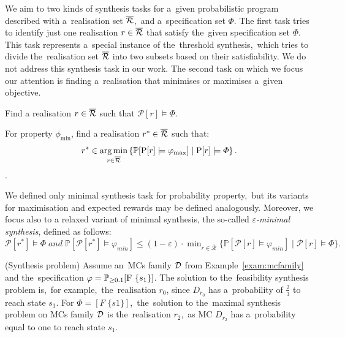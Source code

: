 We aim to two kinds of synthesis tasks for a~given probabilistic program described with a~realisation set $\overline{\mathcal{R}}$,~and a~specification set $\varPhi$.
The first task tries to identify just one realisation $r \in \overline{\mathcal{R}}$ that satisfy the~given specification set $\varPhi$.
This task represents a~special instance of the~threshold synthesis,~which tries to divide the~realisation set $\overline{\mathcal{R}}$ into two subsets based on their satisfiability.
We do not address this synthesis task in our work.
The second task on which we focus our attention is finding a~realisation that minimises or maximises a~given objective.

\begin{definition}[Feasibility]
Find a realisation $r \in \overline{\mathcal{R}}$ such that $\mathcal{P}[r] \models \varPhi$. 
\end{definition}

\begin{definition}[Minimality] \label{def:minimality}
For property $\phi_{\min}$, find a realisation $r^* \in \overline{\mathcal{R}}$ such that:
$$r^* \in \operatorname*{arg\,min}_{r \in \overline{\mathcal{R}}} \left \{ \mathbb{P}[\mathrm{P}[r] \models \varphi_{\max}] \mid \mathrm{P}[r] \models \varPhi \right \}.$$.
\end{definition}

We defined only minimal synthesis task for probability property,~but its variants for maximisation and expected rewards may be defined analogously.
Moreover, we focus also to a relaxed variant of minimal synthesis, the so-called \textit{$\varepsilon$-minimal synthesis}, defined as follows: $\mathcal{P}[r^*] \models \varPhi \; and \; 
\mathbb{P}[\mathcal{P}[r^*] \models \varphi_{min}] \leq (1 - \varepsilon) \cdot \min_{r \in \mathcal{\overline{R}}} \{ \mathbb{P}[\mathcal{P}[r] \models \varphi_{min}] \; \lvert \; \mathcal{P}[r] \models \varPhi \}.$

\begin{example} (Synthesis problem)
Assume an~MCs family $\mathcal{D}$ from Example~\ref{exam:mcfamily} and the~specification $\varphi = \mathbb{P}_{\geq 0.1}[\mathrm{F}\ \{s_1\}]$.
The solution to the~feasibility synthesis problem is,~for example,~the~realisation $r_0$, since $D_{r_0}$ has a~probability of $\frac{2}{3}$ to reach state $s_1$.
For $\varPhi = [F \; \{s1\}]$,~the~solution to the~maximal synthesis problem on MCs family $\mathcal{D}$ is the~realisation $r_2$,~as MC $D_{r_2}$ has a~probability equal to one to reach state $s_1$.
\end{example}

